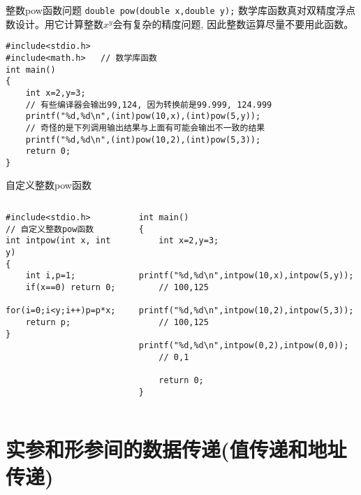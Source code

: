 \begin{frame}{整数pow函数问题}
\vspace{-0.3cm}
\lstinline|double pow(double x,double y);| 数学库函数真对双精度浮点数设计。用它计算整数$x^y$会有复杂的精度问题, 因此整数运算尽量不要用此函数。 
\begin{lstlisting}
#include<stdio.h>
#include<math.h>   // 数学库函数
int main()
{
	int x=2,y=3;
	// 有些编译器会输出99,124, 因为转换前是99.999, 124.999 
	printf("%d,%d\n",(int)pow(10,x),(int)pow(5,y)); 	
	// 奇怪的是下列调用输出结果与上面有可能会输出不一致的结果 
	printf("%d,%d\n",(int)pow(10,2),(int)pow(5,3)); 
	return 0;
}
\end{lstlisting}
\end{frame}

\begin{frame}{自定义整数pow函数}
\vspace{-0.5cm}
\begin{columns}[T]
\begin{lstlisting}
#include<stdio.h>
// 自定义整数pow函数
int intpow(int x, int y)
{
	int i,p=1;
	if(x==0) return 0; 
	for(i=0;i<y;i++)p=p*x;
	return p;
} 
\end{lstlisting}
\begin{lstlisting}[frame=leftline]
int main()
{
	int x=2,y=3;
	
	printf("%d,%d\n",intpow(10,x),intpow(5,y)); 
	// 100,125
	printf("%d,%d\n",intpow(10,2),intpow(5,3)); 
	// 100,125
	printf("%d,%d\n",intpow(0,2),intpow(0,0)); 
	// 0,1 
	
	return 0;
}
\end{lstlisting}
\end{columns}
\end{frame}


\section{实参和形参间的数据传递(值传递和地址传递)}

